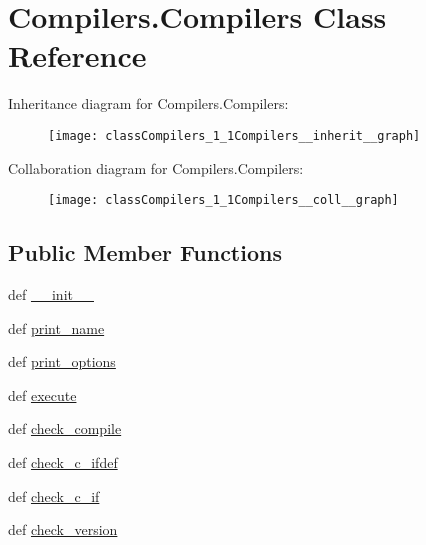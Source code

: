 \hypertarget{classCompilers_1_1Compilers}{\section{Compilers.\-Compilers Class Reference}
\label{classCompilers_1_1Compilers}
}


Inheritance diagram for Compilers.\-Compilers\-:\nopagebreak
\begin{figure}[H]
\begin{center}
\leavevmode
\texttt{[image: classCompilers\_1\_1Compilers\_\_inherit\_\_graph]}
\end{center}
\end{figure}


Collaboration diagram for Compilers.\-Compilers\-:\nopagebreak
\begin{figure}[H]
\begin{center}
\leavevmode
\texttt{[image: classCompilers\_1\_1Compilers\_\_coll\_\_graph]}
\end{center}
\end{figure}
\subsection*{Public Member Functions}
\begin{DoxyCompactItemize}
\item 
def \hyperlink{classCompilers_1_1Compilers_a401d7750736badfcabbcdd39909109c7}{\-\_\-\-\_\-init\-\_\-\-\_\-}
\item 
def \hyperlink{classCompilers_1_1Compilers_aabd91a4eeb39804bbddba7c5bb1b6ec0}{print\-\_\-name}
\item 
def \hyperlink{classCompilers_1_1Compilers_a152a2bd6caf05098ebdfd2e336c1f71b}{print\-\_\-options}
\item 
def \hyperlink{classCompilers_1_1Compilers_a85044d54e6b66cb5f29328a75f5bf446}{execute}
\item 
def \hyperlink{classCompilers_1_1Compilers_aac1f107915d98d9b076c68a7ebc2ec48}{check\-\_\-compile}
\item 
def \hyperlink{classCompilers_1_1Compilers_a82b789e14047fa9d8027c9df59c95dca}{check\-\_\-c\-\_\-ifdef}
\item 
def \hyperlink{classCompilers_1_1Compilers_a5a8137663ccef6cb4a82c2636d93ce3b}{check\-\_\-c\-\_\-if}
\item 
def \hyperlink{classCompilers_1_1Compilers_a3a65f6da74cda8747cfc7af58ad2e1ee}{check\-\_\-version}
\end{DoxyCompactItemize}
